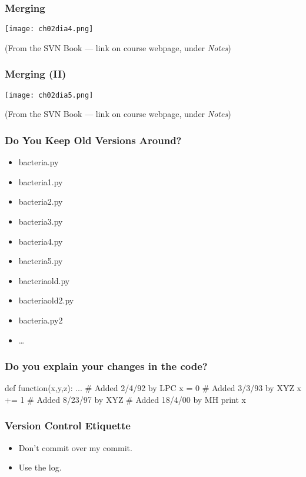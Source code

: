\begin{frame}[fragile]
\frametitle{Merging}

\centering
\texttt{[image: ch02dia4.png]}

\begin{flushright}
(From the SVN Book --- link on course webpage, under \textit{Notes})
\end{flushright}

\end{frame}

\begin{frame}[fragile]
\frametitle{Merging (II)}

\centering
\texttt{[image: ch02dia5.png]}

\begin{flushright}
(From the SVN Book --- link on course webpage, under \textit{Notes})
\end{flushright}

\end{frame}

\begin{frame}[fragile]
\frametitle{Do You Keep Old Versions Around?}
\begin{itemize}
\item bacteria.py
\item bacteria1.py
\item bacteria2.py
\item bacteria3.py
\item bacteria4.py
\item bacteria5.py
\item bacteriaold.py
\item bacteriaold2.py
\item bacteria.py2
\item \ldots
\end{itemize}
\end{frame}

\begin{frame}[fragile]
\frametitle{Do you explain your changes in the code?}

\begin{python}
def function(x,y,z):
    ...
    # Added 2/4/92 by LPC
    x = 0
    # Added 3/3/93 by XYZ
    x += 1
    # Added 8/23/97 by XYZ
    # Added 18/4/00 by MH
    print x
\end{python}
\end{frame}

\begin{frame}[fragile]
\frametitle{Version Control Etiquette}
\begin{itemize}
\item Don't commit over my commit.
\item Use the log.
\end{itemize}
\end{frame}

